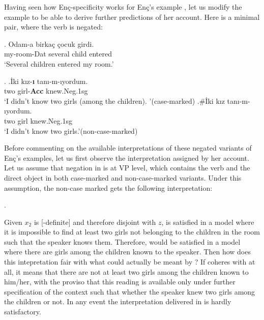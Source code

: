 \documentclass[11pt,a4paper]{article}
\newcommand{\encspec}{Enç-specific}
\begin{document}
Having seen how \encspec ity works for Enç's example , let us modify the example to be able to derive further predictions of her account. Here is a minimal pair, where the verb  is negated:

\exg.\label{Exenc16neg}%
{Odam-a}  {birka\c{c}} {\c{c}ocuk} {girdi.}\\
{my-room-Dat} {several}  {child}  {entered}\\
`Several children entered my room.'

\ex.\label{Exenc17neg}
\ag.\label{Exencnegacc}{\.Iki}  {k\i{}z-\textbf{\i}} {tan\i{}-m-ıyordum}.\\
{two}  {girl-{\bf Acc}}  {knew.Neg.1sg}\\
`I didn't know two girls (among the children). '\hfill (case-marked)
\bg.\label{Exencnegzero}\#{\.Iki}  {k\i{}z}  {tan\i{}-m-ıyordum.} \\
{two}  {girl}  {knew.Neg.1sg}\\
`I didn't know two girls.'\hfill (non-case-marked)

Before commenting on the available interpretations of these negated variants of Enç's examples, let us first observe the interpretation assigned by her account. Let us assume that negation in  is at VP level, which contains the verb and the direct object in both case-marked and non-case-marked variants. Under this assumption, the non-case marked  gets the following interpretation:

\ex.\label{Exencnegzerodrs}

Given $x_2$ is [-definite] and therefore disjoint with $z$,
 is satisfied in a model where it is impossible to find
at least two girls not belonging to the children in the room such that the
speaker knows them. Therefore,  would be satisfied in a
model where there are girls among the children known to the speaker.  Then how
does this intepretation fair with what could actually be meant by
? If  coheres with 
at all, it means that there are not at least two girls among the children known
to him/her, with the proviso that this reading is available only under further
specification of the context such that whether the speaker knew two girls among
the children or not. In any event the interpretation delivered in
 is hardly satisfactory.
\end{document}
